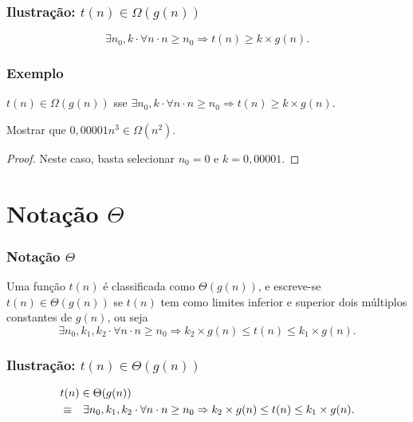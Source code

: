 \documentclass{beamer}
\begin{document}
\begin{frame}
  \frametitle{Ilustração: $t(n) \in \Omega(g(n))$}
  \begin{center}
    
  \end{center}
$$
\exists n_0, k \cdot \forall n \cdot n \ge n_0 \Rightarrow t(n) \ge k \times g(n).
$$
\end{frame}

\begin{frame}
\frametitle{Exemplo}

\begin{definition}
$t(n) \in \Omega(g(n))$ sse $\exists n_0, k \cdot \forall n \cdot n \ge n_0 \Rightarrow t(n) \ge k \times g(n)$.
\end{definition}

\begin{example}
Mostrar que $0,00001 n^3 \in \Omega(n^2)$.
\end{example}

\begin{proof}
  Neste caso, basta selecionar $n_0 = 0$ e $k = 0,00001$.
\end{proof}
\end{frame}


\section{Notação \texorpdfstring{$\Theta$}{Big Theta}}

\begin{frame}
\frametitle{Notação $\Theta$}
\begin{definition}
Uma função $t(n)$ é classificada como $\Theta(g(n))$, e escreve-se $t(n) \in \Theta(g(n))$ se $t(n)$ tem como limites inferior e superior dois múltiplos constantes de $g(n)$, ou seja
$$
\exists n_0, k_1, k_2 \cdot \forall n \cdot n \ge n_0 \Rightarrow k_2 \times g(n) \le t(n) \le k_1 \times g(n).
$$
\end{definition}
\end{frame}

\begin{frame}
  \frametitle{Ilustração: $t(n) \in \Theta(g(n))$}
  \begin{center}
    
  \end{center}
\begin{eqnarray*}
\lefteqn{t(n) \in \Theta(g(n))} \\
& \equiv & \exists n_0, k_1, k_2 \cdot \forall n \cdot n \ge n_0 \Rightarrow k_2 \times g(n) \le t(n) \le k_1 \times g(n).
\end{eqnarray*}

\end{frame}
\end{document}
